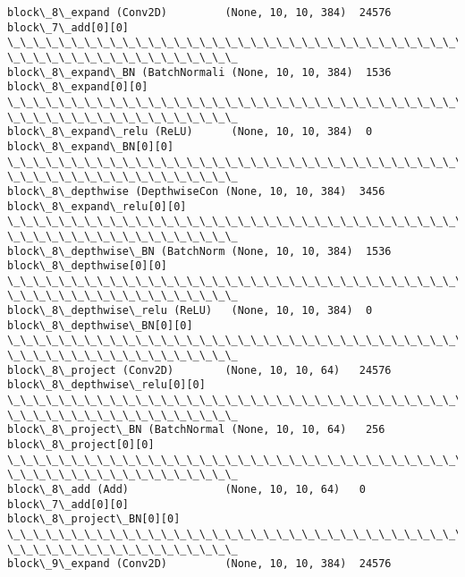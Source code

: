 \documentclass[11pt]{article}
\begin{document}
\begin{Verbatim}[commandchars=\\\{\}]
block\_8\_expand (Conv2D)         (None, 10, 10, 384)  24576
block\_7\_add[0][0]
\_\_\_\_\_\_\_\_\_\_\_\_\_\_\_\_\_\_\_\_\_\_\_\_\_\_\_\_\_\_\_\_\_\_\_\_\_\_\_\_\_\_\_\_\_\_\_\_\_\_\_\_\_\_\_\_\_\_\_\_\_\_\_\_\_\_\_\_\_\_\_\_\_\_\_\_\_\_\_\_
\_\_\_\_\_\_\_\_\_\_\_\_\_\_\_\_\_\_
block\_8\_expand\_BN (BatchNormali (None, 10, 10, 384)  1536
block\_8\_expand[0][0]
\_\_\_\_\_\_\_\_\_\_\_\_\_\_\_\_\_\_\_\_\_\_\_\_\_\_\_\_\_\_\_\_\_\_\_\_\_\_\_\_\_\_\_\_\_\_\_\_\_\_\_\_\_\_\_\_\_\_\_\_\_\_\_\_\_\_\_\_\_\_\_\_\_\_\_\_\_\_\_\_
\_\_\_\_\_\_\_\_\_\_\_\_\_\_\_\_\_\_
block\_8\_expand\_relu (ReLU)      (None, 10, 10, 384)  0
block\_8\_expand\_BN[0][0]
\_\_\_\_\_\_\_\_\_\_\_\_\_\_\_\_\_\_\_\_\_\_\_\_\_\_\_\_\_\_\_\_\_\_\_\_\_\_\_\_\_\_\_\_\_\_\_\_\_\_\_\_\_\_\_\_\_\_\_\_\_\_\_\_\_\_\_\_\_\_\_\_\_\_\_\_\_\_\_\_
\_\_\_\_\_\_\_\_\_\_\_\_\_\_\_\_\_\_
block\_8\_depthwise (DepthwiseCon (None, 10, 10, 384)  3456
block\_8\_expand\_relu[0][0]
\_\_\_\_\_\_\_\_\_\_\_\_\_\_\_\_\_\_\_\_\_\_\_\_\_\_\_\_\_\_\_\_\_\_\_\_\_\_\_\_\_\_\_\_\_\_\_\_\_\_\_\_\_\_\_\_\_\_\_\_\_\_\_\_\_\_\_\_\_\_\_\_\_\_\_\_\_\_\_\_
\_\_\_\_\_\_\_\_\_\_\_\_\_\_\_\_\_\_
block\_8\_depthwise\_BN (BatchNorm (None, 10, 10, 384)  1536
block\_8\_depthwise[0][0]
\_\_\_\_\_\_\_\_\_\_\_\_\_\_\_\_\_\_\_\_\_\_\_\_\_\_\_\_\_\_\_\_\_\_\_\_\_\_\_\_\_\_\_\_\_\_\_\_\_\_\_\_\_\_\_\_\_\_\_\_\_\_\_\_\_\_\_\_\_\_\_\_\_\_\_\_\_\_\_\_
\_\_\_\_\_\_\_\_\_\_\_\_\_\_\_\_\_\_
block\_8\_depthwise\_relu (ReLU)   (None, 10, 10, 384)  0
block\_8\_depthwise\_BN[0][0]
\_\_\_\_\_\_\_\_\_\_\_\_\_\_\_\_\_\_\_\_\_\_\_\_\_\_\_\_\_\_\_\_\_\_\_\_\_\_\_\_\_\_\_\_\_\_\_\_\_\_\_\_\_\_\_\_\_\_\_\_\_\_\_\_\_\_\_\_\_\_\_\_\_\_\_\_\_\_\_\_
\_\_\_\_\_\_\_\_\_\_\_\_\_\_\_\_\_\_
block\_8\_project (Conv2D)        (None, 10, 10, 64)   24576
block\_8\_depthwise\_relu[0][0]
\_\_\_\_\_\_\_\_\_\_\_\_\_\_\_\_\_\_\_\_\_\_\_\_\_\_\_\_\_\_\_\_\_\_\_\_\_\_\_\_\_\_\_\_\_\_\_\_\_\_\_\_\_\_\_\_\_\_\_\_\_\_\_\_\_\_\_\_\_\_\_\_\_\_\_\_\_\_\_\_
\_\_\_\_\_\_\_\_\_\_\_\_\_\_\_\_\_\_
block\_8\_project\_BN (BatchNormal (None, 10, 10, 64)   256
block\_8\_project[0][0]
\_\_\_\_\_\_\_\_\_\_\_\_\_\_\_\_\_\_\_\_\_\_\_\_\_\_\_\_\_\_\_\_\_\_\_\_\_\_\_\_\_\_\_\_\_\_\_\_\_\_\_\_\_\_\_\_\_\_\_\_\_\_\_\_\_\_\_\_\_\_\_\_\_\_\_\_\_\_\_\_
\_\_\_\_\_\_\_\_\_\_\_\_\_\_\_\_\_\_
block\_8\_add (Add)               (None, 10, 10, 64)   0
block\_7\_add[0][0]
block\_8\_project\_BN[0][0]
\_\_\_\_\_\_\_\_\_\_\_\_\_\_\_\_\_\_\_\_\_\_\_\_\_\_\_\_\_\_\_\_\_\_\_\_\_\_\_\_\_\_\_\_\_\_\_\_\_\_\_\_\_\_\_\_\_\_\_\_\_\_\_\_\_\_\_\_\_\_\_\_\_\_\_\_\_\_\_\_
\_\_\_\_\_\_\_\_\_\_\_\_\_\_\_\_\_\_
block\_9\_expand (Conv2D)         (None, 10, 10, 384)  24576

\end{Verbatim}
\end{document}
